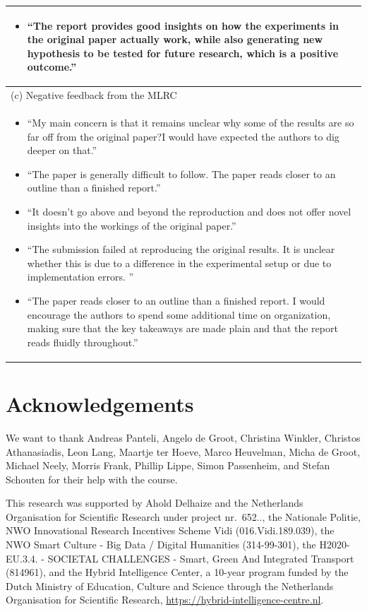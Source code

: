 \documentclass[letterpaper]{article}
\begin{document}
\begin{table}[htbp!]
\begin{tabular}{@{}l@{}}
\begin{minipage}[t]{\columnwidth}
\begin{itemize}[leftmargin=*]
\item ``The report provides good insights on how the experiments in the original paper actually work, while also generating new hypothesis to be tested for future research, which is a positive outcome.''
\end{itemize}
\end{minipage}
\\
\midrule
(c) Negative feedback from the MLRC \\
\midrule
\begin{minipage}[t]{\columnwidth}
\begin{itemize}[leftmargin=*]
\item ``My main concern is that it remains unclear why some of the results are so far off from the original paper?I would have expected the authors to dig deeper on that.''
\item ``The paper is generally difficult to follow. The paper reads closer to an outline than a finished report.''
\item ``It doesn't go above and beyond the reproduction and does not offer novel insights into the workings of the original paper.''
\item ``The submission failed at reproducing the original results. It is unclear whether this is due to a difference in the experimental setup or due to implementation errors. ''
\item ``The paper reads closer to an outline than a finished report. I would encourage the authors to spend some additional time on organization, making sure that the key takeaways are made plain and that the report reads fluidly throughout.''
\end{itemize}
\end{minipage}
\\
\bottomrule
\end{tabular}
\label{tab:feedback}
\end{table}


\section*{Acknowledgements}
We want to thank 
Andreas Panteli, 
Angelo de Groot, 
Christina Winkler, 
Christos Athanasiadis, 
Leon Lang, 
Maartje ter Hoeve, 
Marco Heuvelman, 
Micha de Groot,
Michael Neely, 
Morris Frank, 
Phillip Lippe, 
Simon Passenheim, and
Stefan Schouten 
for their help with the course. 

This research was supported by Ahold Delhaize and the Netherlands Organisation for Scientific Research under project nr.\ 652.., the Nationale Politie, NWO Innovational Research Incentives Scheme Vidi (016.Vidi.189.039), the NWO Smart Culture - Big Data / Digital Humanities (314-99-301), the H2020-EU.3.4. - SOCIETAL CHALLENGES - Smart, Green And Integrated Transport (814961), and the Hybrid Intelligence Center, a 10-year program funded by the Dutch Ministry of Education, Culture and Science through the Netherlands Organisation for Scientific Research, 
\url{https://hybrid-intelligence-centre.nl}.
\end{document}
